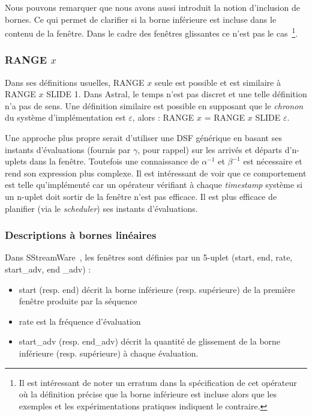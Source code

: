Nous pouvons remarquer que nous avons aussi introduit la notion d'inclusion de bornes. Ce qui permet de clarifier si la borne inférieure est incluse dans le contenu de la fenêtre. Dans le cadre des fenêtres glissantes ce n'est pas le cas~\footnote{Il est intéressant de noter un erratum dans la spécification de cet opérateur où la définition précise que la borne inférieure est incluse alors que les exemples et les expérimentations pratiques indiquent le contraire.}.

\subsubsection{RANGE $x$}
Dans ses définitions usuelles, RANGE $x$ seule est possible et est similaire à RANGE $x$ SLIDE 1. Dans Astral, le temps n'est pas discret et une telle définition n'a pas de sens. Une définition similaire est possible en supposant que le \textit{chronon} du système d'implémentation est $\varepsilon$, alors : RANGE $x$ = RANGE $x$ SLIDE $\varepsilon$.

Une approche plus propre serait d'utiliser une DSF générique en basant ses instants d'évaluations (fournis par $\gamma$, pour rappel) sur les arrivés et départs d'n-uplets dans la fenêtre. Toutefois une connaissance de $\alpha^{-1}$ et $\beta^{-1}$ est nécessaire et rend son expression plus complexe. Il est intéressant de voir que ce comportement est telle qu'implémenté car un opérateur vérifiant à chaque \textit{timestamp} système si un n-uplet doit sortir de la fenêtre n'est pas efficace. Il est plus efficace de planifier (via le \textit{scheduler}) ses instants d'évaluations.

\subsubsection{Descriptions à bornes linéaires}
Dans SStreamWare~\cite{Gurgen:sstreamware}, les fenêtres sont définies par un 5-uplet (start, end, rate, start\_adv, end \_adv) :
\begin{itemize}
	\item start (resp. end) décrit la borne inférieure (resp. supérieure) de la première fenêtre produite par la séquence
	\item rate est la fréquence d'évaluation
	\item start\_adv (resp. end\_adv) décrit la quantité de glissement de la borne inférieure (resp. supérieure) à chaque évaluation.
\end{itemize}

